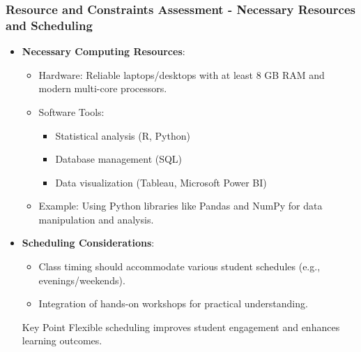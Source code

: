 \documentclass[aspectratio=169]{beamer}
\begin{document}
\begin{frame}[fragile]
    \frametitle{Resource and Constraints Assessment - Necessary Resources and Scheduling}
    \begin{itemize}
        \item \textbf{Necessary Computing Resources}:
        \begin{itemize}
            \item Hardware: Reliable laptops/desktops with at least 8 GB RAM and modern multi-core processors.
            \item Software Tools:
            \begin{itemize}
                \item Statistical analysis (R, Python)
                \item Database management (SQL)
                \item Data visualization (Tableau, Microsoft Power BI)
            \end{itemize}
            \item Example: Using Python libraries like Pandas and NumPy for data manipulation and analysis.
        \end{itemize}
        
        \item \textbf{Scheduling Considerations}:
        \begin{itemize}
            \item Class timing should accommodate various student schedules (e.g., evenings/weekends).
            \item Integration of hands-on workshops for practical understanding.
        \end{itemize}
        \begin{block}{Key Point}
            Flexible scheduling improves student engagement and enhances learning outcomes.
        \end{block}
    \end{itemize}
\end{frame}
\end{document}
